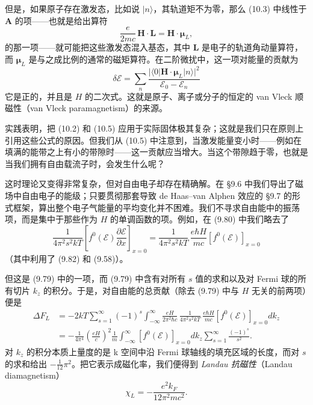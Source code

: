 但是，如果原子存在激发态，比如说 $|n\rangle$，其轨道矩不为零，那么 (10.3) 中线性于 $\mathbf{A}$ 的项——也就是给出算符
\begin{equation*}
\frac{e}{2mc}\,\mathbf{H}\cdot\mathbf{L}=\mathbf{H}\cdot\boldsymbol{\mu}_{L},
\tag{10.4}
\end{equation*}
的那一项——就可能把这些激发态混入基态，其中 $\mathbf{L}$ 是电子的轨道角动量算符，而 $\boldsymbol{\mu}_{L}$ 是与之成比例的通常的磁矩算符。在二阶微扰中，这一项对能量的贡献为
\begin{equation*}
\delta\mathcal{E}=\sum_{n}\frac{|\langle 0|\mathbf{H}\cdot\boldsymbol{\mu}_{L}|n\rangle|^{2}}{\mathcal{E}_{0}-\mathcal{E}_{n}}
\tag{10.5}
\end{equation*}
它是正的，并且是 $H$ 的二次式。这就是原子、离子或分子的恒定的 van Vleck 顺磁性（van Vleck paramagnetism）的来源。

实践表明，把 (10.2) 和 (10.5) 应用于实际固体极其复杂；这就是我们只在原则上引用这些公式的原因。但我们从 (10.5) 中注意到，当激发能量变小时——例如在填满的能带之上有小的带隙时——这一贡献应当增大。当这个带隙趋于零，也就是当我们拥有自由载流子时，会发生什么呢？

这时理论又变得非常复杂，但对自由电子却存在精确解。在 §9.6 中我们导出了磁场中自由电子的能级；只要贯彻那套导致 de Haas--van Alphen 效应的 §9.7 的形式框架，算出整个电子气能量的平均变化并不困难。我们不寻求自由能中的振荡项，而是集中于那些作为 $H$ 的单调函数的项。例如，在 (9.80) 中我们略去了
\begin{equation*}
\frac{1}{4\pi^{2}s^{2}kT}\left[f^{0}(\mathcal{E})\frac{\partial\mathcal{E}}{\partial x}\right]_{x=0}
=\frac{1}{4\pi^{2}s^{2}kT}\,\frac{e\hbar H}{mc}\left[f^{0}(\mathcal{E})\right]_{x=0}
\tag{10.6}
\end{equation*}
（其中利用了 (9.82) 和 (9.58)）。

但这是 (9.79) 中的一项，而 (9.79) 中含有对所有 $s$ 值的求和以及对 Fermi 球的所有切片 $k_{z}$ 的积分。于是，对自由能的总贡献（除去 (9.79) 中与 $H$ 无关的前两项）便是
\begin{align*}
\Delta F_{L} &=-2kT\sum_{s=1}^{\infty}(-1)^{s}\int_{-\infty}^{\infty}\frac{eH}{2\pi^{2}\hbar c}\,\frac{1}{4\pi^{2}s^{2}kT}\,\frac{e\hbar H}{mc}\left[f^{0}(\mathcal{E})\right]_{x=0}dk_{z}\\
&=-\frac{1}{4\pi^{4}}\left(\frac{eH}{c}\right)^{2}\frac{1}{m}\int_{-\infty}^{\infty}\left[f^{0}(\mathcal{E})\right]_{x=0}dk_{z}\sum_{s=1}^{\infty}\frac{(-1)^{s}}{s^{2}}.
\tag{10.7}
\end{align*}
对 $k_{z}$ 的积分本质上量度的是 k 空间中沿 Fermi 球轴线的填充区域的长度，而对 $s$ 的求和给出 $-\frac{1}{12}\pi^{2}$。把它表示成磁化率，我们便得到 \emph{Landau 抗磁性}（Landau diamagnetism）
\begin{equation*}
\chi_{L}=-\frac{e^{2}k_{F}}{12\pi^{2}mc^{2}}.
\tag{10.8}
\end{equation*}

